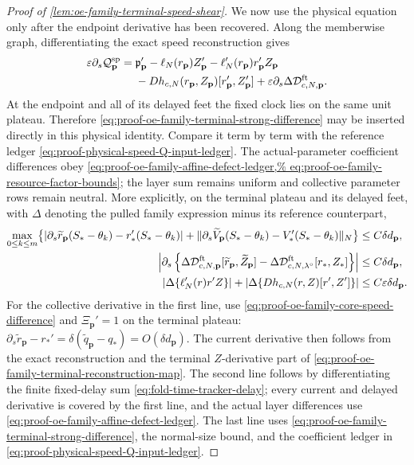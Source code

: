 \begin{proof}[Proof of
\cref{lem:oe-family-terminal-speed-shear}]
We now use the physical equation only after the endpoint derivative has
been recovered.  Along the memberwise graph, differentiating the exact
speed reconstruction gives
\begin{align}
 \varepsilon\partial_s\mathcal Q_{\mathbf p}^{\rm sp}
={}&\mathfrak p_{\mathbf p}'
 -\ell_N(r_{\mathbf p})Z_{\mathbf p}'
 -\ell_N'(r_{\mathbf p})r_{\mathbf p}'Z_{\mathbf p}\notag\\
&-Dh_{c,N}(r_{\mathbf p},Z_{\mathbf p})
       [r_{\mathbf p}',Z_{\mathbf p}']
 +\varepsilon\partial_s
       \Delta\mathcal D_{c,N,\mathbf p}^{\rm ft}.
                                                        \label{eq:proof-oe-family-speed-Q-derivative}
\end{align}
At the endpoint and all of its delayed feet the fixed clock lies on the
same unit plateau.  Therefore
\cref{eq:proof-oe-family-terminal-strong-difference} may be inserted
directly in this physical identity.  Compare it term by term with the
reference ledger
\cref{eq:proof-physical-speed-Q-input-ledger}.  The actual-parameter
coefficient differences obey
\cref{eq:proof-oe-family-affine-defect-ledger,%
eq:proof-oe-family-resource-factor-bounds}; the layer sum remains
uniform and collective parameter rows remain neutral.  More explicitly,
on the terminal plateau and its delayed feet, with \(\Delta\) denoting
the pulled family expression minus its reference counterpart,
\begin{align}
 \max_{0\le k\le m}\bigl\{
 |\partial_s\widetilde r_{\mathbf p}(S_*-\theta_k)
          -r_*'(S_*-\theta_k)|
 +\|\partial_s\widetilde V_{\mathbf p}(S_*-\theta_k)
          -V_*'(S_*-\theta_k)\|_N\bigr\}
 &\le C\delta d_{\mathbf p},\notag\\
 \left|\partial_s\left\{
   \Delta\mathcal D_{c,N,\mathbf p}^{\rm ft}
       [\widetilde r_{\mathbf p},\widetilde Z_{\mathbf p}]
  -\Delta\mathcal D_{c,N,\lambda^\circ}^{\rm ft}
       [r_*,Z_*]\right\}\right|
 &\le C\delta d_{\mathbf p},\notag\\
 \left|\Delta\{\ell_N'(r)r'Z\}\right|
 +\left|\Delta\{Dh_{c,N}(r,Z)[r',Z']\}\right|
 &\le C\varepsilon\delta d_{\mathbf p}.
                                                        \label{eq:proof-oe-family-speed-terminal-difference-ledger}
\end{align}
For the collective derivative in the first line, use
\cref{eq:proof-oe-family-core-speed-difference} and
\(\Xi_{\mathbf p}'=1\) on the terminal plateau:
\(\partial_s\widetilde r_{\mathbf p}
 -r_*'=\delta(\widetilde q_{\mathbf p}-q_*)=O(\delta d_{\mathbf p})\).
The current derivative then follows from the exact reconstruction and the
terminal \(Z\)-derivative part of
\cref{eq:proof-oe-family-terminal-reconstruction-map}.  The second line follows
by differentiating the finite fixed-delay sum
\cref{eq:fold-time-tracker-delay}; every current and delayed derivative is
covered by the first line, and the actual layer differences use
\cref{eq:proof-oe-family-affine-defect-ledger}.  The last line uses
\cref{eq:proof-oe-family-terminal-strong-difference}, the normal-size
bound, and the coefficient ledger in
\cref{eq:proof-physical-speed-Q-input-ledger}.


\end{proof}
